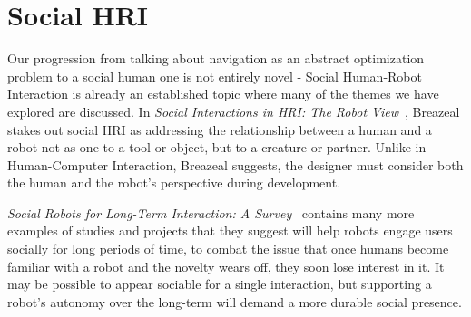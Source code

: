 \documentclass{sfuthesis}
\begin{document}





\section{Social HRI}

Our progression from talking about navigation as an abstract optimization problem to a social human one is not entirely novel - Social Human-Robot Interaction is already an established topic where many of the themes we have explored are discussed. In \textit{Social Interactions in HRI: The Robot View}~\cite{breazeal2004social}, Breazeal stakes out social HRI as addressing the relationship between a human and a robot not as one to a tool or object, but to a creature or partner. Unlike in Human-Computer Interaction, Breazeal suggests, the designer must consider both the human and the robot's perspective during development. 


\textit{Social Robots for Long-Term Interaction: A Survey}~\cite{leite2013social} contains many more examples of studies and projects that they suggest will help robots engage users socially for long periods of time, to combat the issue that once humans become familiar with a robot and the novelty wears off, they soon lose interest in it. It may be possible to appear sociable for a single interaction, but supporting a robot's autonomy over the long-term will demand a more durable social presence.


\end{document}
